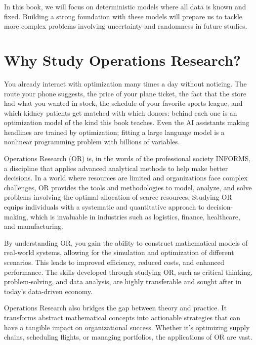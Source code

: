 In this book, we will focus on deterministic models where all data is known and fixed. Building a strong foundation with these models will prepare us to tackle more complex problems involving uncertainty and randomness in future studies.

\section{Why Study Operations Research?}
\label{sec:why-OR}

You already interact with optimization many times a day without noticing.  The route your phone suggests, the price of your plane ticket, the fact that the store had what you wanted in stock, the schedule of your favorite sports league, and which kidney patients get matched with which donors: behind each one is an optimization model of the kind this book teaches.  Even the AI assistants making headlines are trained by optimization; fitting a large language model is a nonlinear programming problem with billions of variables.

Operations Research (OR) is, in the words of the professional society INFORMS, a discipline that applies advanced analytical methods to help make better decisions. In a world where resources are limited and organizations face complex challenges, OR provides the tools and methodologies to model, analyze, and solve problems involving the optimal allocation of scarce resources. Studying OR equips individuals with a systematic and quantitative approach to decision-making, which is invaluable in industries such as logistics, finance, healthcare, and manufacturing.

By understanding OR, you gain the ability to construct mathematical models of real-world systems, allowing for the simulation and optimization of different scenarios. This leads to improved efficiency, reduced costs, and enhanced performance. The skills developed through studying OR, such as critical thinking, problem-solving, and data analysis, are highly transferable and sought after in today's data-driven economy.

Operations Research also bridges the gap between theory and practice. It transforms abstract mathematical concepts into actionable strategies that can have a tangible impact on organizational success. Whether it's optimizing supply chains, scheduling flights, or managing portfolios, the applications of OR are vast.

